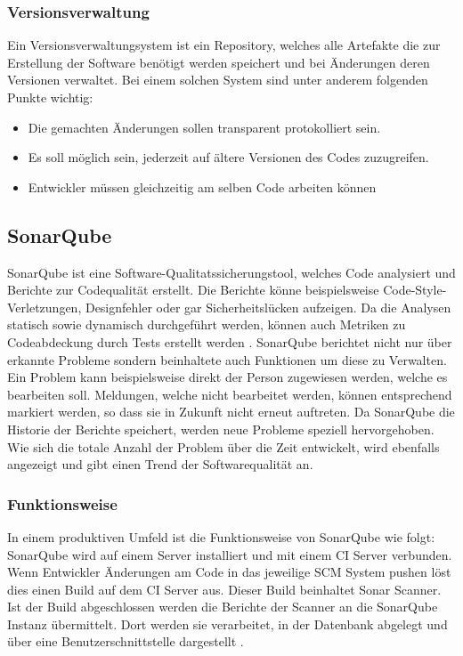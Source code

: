 \subsubsection{Versionsverwaltung}
Ein Versionsverwaltungsystem ist ein Repository, welches alle Artefakte die zur Erstellung der Software benötigt werden speichert und bei Änderungen deren Versionen verwaltet.
Bei einem solchen System sind unter anderem folgenden Punkte wichtig:
\begin{itemize}
   \item Die gemachten Änderungen sollen transparent protokolliert sein.
   \item Es soll möglich sein, jederzeit auf ältere Versionen des Codes zuzugreifen.
   \item Entwickler müssen gleichzeitig am selben Code arbeiten können
\end{itemize}



\subsection{SonarQube}\label{quality:sonar}
SonarQube ist eine Software-Qualitatssicherungstool, welches Code analysiert und Berichte zur Codequalität erstellt.
Die Berichte könne beispielsweise Code-Style-Verletzungen, Designfehler oder gar Sicherheitslücken aufzeigen.
Da die Analysen statisch sowie dynamisch durchgeführt werden, können auch Metriken zu Codeabdeckung durch Tests erstellt werden \parencite{malloy_2021}.
SonarQube berichtet nicht nur über erkannte Probleme sondern beinhaltete auch Funktionen um diese zu Verwalten.
Ein Problem kann beispielsweise direkt der Person zugewiesen werden, welche es bearbeiten soll.
Meldungen, welche nicht bearbeitet werden, können entsprechend markiert werden, so dass sie in Zukunft nicht erneut auftreten.
Da SonarQube die Historie der Berichte speichert, werden neue Probleme speziell hervorgehoben.
Wie sich die totale Anzahl der Problem über die Zeit entwickelt, wird ebenfalls angezeigt und gibt einen Trend der Softwarequalität an.


\subsubsection{Funktionsweise}\label{sonar:funktionsweise}
In einem produktiven Umfeld ist die Funktionsweise von SonarQube wie folgt:
SonarQube wird auf einem Server installiert und mit einem \ac{CI} Server verbunden.
Wenn Entwickler Änderungen am Code in das jeweilige \ac{SCM} System pushen löst dies einen Build auf dem \ac{CI} Server aus.
Dieser Build beinhaltet Sonar Scanner.
Ist der Build abgeschlossen werden die Berichte der Scanner an die SonarQube Instanz übermittelt.
Dort werden sie verarbeitet, in der Datenbank abgelegt und über eine Benutzerschnittstelle dargestellt \parencite{malloy_2021}.

